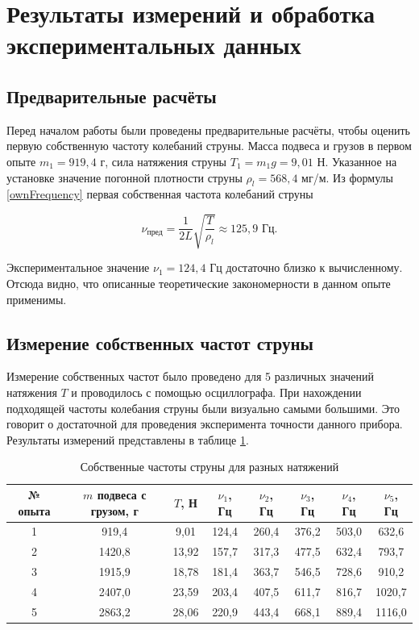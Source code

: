 \documentclass[a4paper,12pt]{article} %
\begin{document}
\section{Результаты измерений и обработка экспериментальных данных}

\subsection{Предварительные расчёты}

Перед началом работы были проведены предварительные расчёты, чтобы оценить первую собственную частоту колебаний струны. Масса подвеса и грузов в первом опыте $ m_1 = 919,4 $ г, сила натяжения струны $ T_1 = m_1 g = 9,01 $ Н. Указанное на установке значение погонной плотности струны $ \rho_l = 568,4 $ мг/м. Из формулы \eqref{ownFrequency} первая собственная частота колебаний струны

\begin{equation}
    \nu_\text{пред} = \frac{1}{2L}\sqrt{\frac{T}{\rho_l}} \approx 125,9 \text{ Гц}.
\end{equation}

Экспериментальное значение $ \nu_1 = 124,4 $ Гц достаточно близко к вычисленному. Отсюда видно, что описанные теоретические закономерности в данном опыте применимы. 

\subsection{Измерение собственных частот струны}

Измерение собственных частот было проведено для 5 различных значений натяжения $ T $ и проводилось с помощью осциллографа. При нахождении подходящей частоты колебания струны были визуально самыми большими. Это говорит о достаточной для проведения эксперимента точности данного прибора.
Результаты измерений представлены в таблице \ref{tab:freaqs}.

\begin{table}[h]
    \centering
    \begin{tabular}{|c|c|c|c|c|c|c|c|}
    \hline
    № опыта & $ m $ подвеса с грузом, г & $ T $, Н & $ \nu_1 $, Гц & $ \nu_2 $, Гц & $ \nu_3 $, Гц & $ \nu_4 $, Гц & $ \nu_5 $, Гц \\ 
    \hline
    1 & 919,4 & 9,01 & 124,4 & 260,4 & 376,2 & 503,0 & 632,6 \\
    \hline
    2 & 1420,8 & 13,92 & 157,7 & 317,3 & 477,5 & 632,4 & 793,7 \\
    \hline
    3 & 1915,9 & 18,78 & 181,4 & 363,7 & 546,5 & 728,6 & 910,2 \\
    \hline
    4 & 2407,0 & 23,59 & 203,4 & 407,5 & 611,7 & 816,7 & 1020,7 \\
    \hline
    5 & 2863,2 & 28,06 & 220,9 & 443,4 & 668,1 & 889,4 & 1116,0 \\
    \hline
    \end{tabular}
    \caption{Собственные частоты струны для разных натяжений}
    \label{tab:freaqs}
\end{table}
\end{document}
